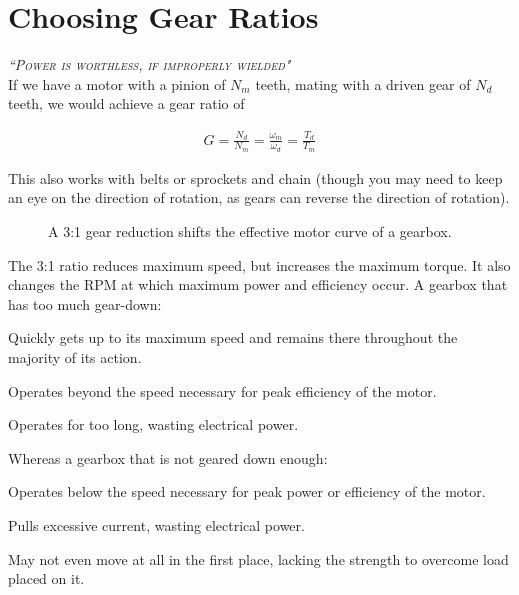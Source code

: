 \documentclass[10pt,letterpaper]{book}
\begin{document}
\chapter{Choosing Gear Ratios}

 {\slshape \scshape ``Power is worthless, if improperly wielded"}
 \\

If we have a motor with a pinion of $N_m$ teeth, mating with a driven gear of $N_d$ teeth, we would achieve a gear ratio of

\begin{align}
  G = \frac{N_d}{N_m} = \frac{\omega_m}{\omega_d} = \frac{T_d}{T_m}
\end{align}

This also works with belts or sprockets and chain (though you may need to keep an eye on the direction of rotation, as gears can reverse the direction of rotation).


\begin{figure}[H] \centering
{}
\caption{A 3:1 gear reduction shifts the effective motor curve of a gearbox.}
\end{figure}

The 3:1 ratio reduces maximum speed, but increases the maximum torque. It also changes the RPM at which maximum power and efficiency occur. A gearbox that has too much gear-down:
\begin{asparaitem}
	\item Quickly gets up to its maximum speed and remains there throughout the majority of its action.
	\item Operates beyond the speed necessary for peak efficiency of the motor.
	\item Operates for too long, wasting electrical power.
\end{asparaitem}

Whereas a gearbox that is not geared down enough:
\begin{asparaitem}
	\item Operates below the speed necessary for peak power or efficiency of the motor.
	\item Pulls excessive current, wasting electrical power.
	\item May not even move at all in the first place, lacking the strength to overcome load placed on it.
\end{asparaitem}
\end{document}
